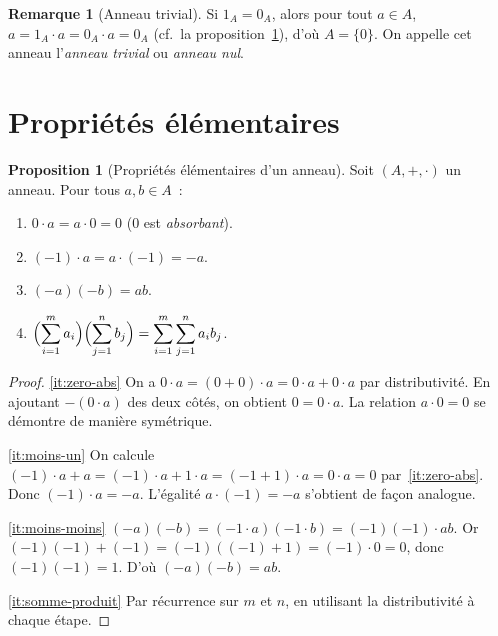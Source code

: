 \documentclass[12pt,a4paper,openany]{book}
\theoremstyle{definition}
\newtheorem{proposition}{Proposition}[chapter]
\newtheorem{remarque}{Remarque}[chapter]
\begin{document}
\begin{remarque}[Anneau trivial]\label{rem:anneau-trivial}
Si $1_A = 0_A$, alors pour tout $a \in A$,
$a = 1_A \cdot a = 0_A \cdot a = 0_A$ (cf.\ la
proposition~\ref{prop:proprietes-elementaires}), d'où $A = \{0\}$.
On appelle cet anneau l'\emph{anneau trivial} ou
\emph{anneau nul}.
\end{remarque}

\section{Propriétés élémentaires}\label{sec:proprietes-elementaires}

\begin{proposition}[Propriétés élémentaires d'un anneau]%
\label{prop:proprietes-elementaires}
Soit $(A, +, \cdot)$ un anneau. Pour tous $a, b \in A$~:
\begin{enumerate}[label=\textup{(\roman*)}]
  \item\label{it:zero-abs} $0 \cdot a = a \cdot 0 = 0$ \quad
        ($0$ est \emph{absorbant}).
  \item\label{it:moins-un} $(-1) \cdot a = a \cdot (-1) = -a$.
  \item\label{it:moins-moins} $(-a)(-b) = ab$.
  \item\label{it:somme-produit}
        $\displaystyle\Bigl(\sum_{i=1}^{m} a_i\Bigr)\Bigl(\sum_{j=1}^{n} b_j\Bigr)
         = \sum_{i=1}^{m}\sum_{j=1}^{n} a_i b_j$.
\end{enumerate}
\end{proposition}

\begin{proof}
\ref{it:zero-abs}\; On a $0 \cdot a = (0 + 0) \cdot a = 0 \cdot a + 0 \cdot a$
par distributivité. En ajoutant $-(0 \cdot a)$ des deux côtés, on obtient
$0 = 0 \cdot a$. La relation $a \cdot 0 = 0$ se démontre de manière symétrique.

\ref{it:moins-un}\; On calcule $(-1) \cdot a + a = (-1) \cdot a + 1 \cdot a
= (-1 + 1) \cdot a = 0 \cdot a = 0$ par~\ref{it:zero-abs}. Donc
$(-1) \cdot a = -a$. L'égalité $a \cdot (-1) = -a$ s'obtient de façon analogue.

\ref{it:moins-moins}\; $(-a)(-b) = (-1 \cdot a)(-1 \cdot b) = (-1)(-1) \cdot ab$.
Or $(-1)(-1) + (-1) = (-1)((-1) + 1) = (-1) \cdot 0 = 0$, donc $(-1)(-1) = 1$.
D'où $(-a)(-b) = ab$.

\ref{it:somme-produit}\; Par récurrence sur $m$ et $n$, en utilisant la
distributivité à chaque étape.
\end{proof}
\end{document}
